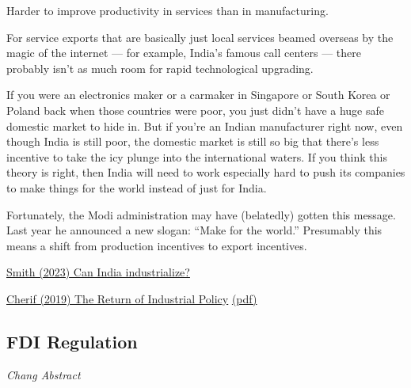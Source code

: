 \documentclass[
]{book}
\begin{document}
Harder to improve productivity in services than in manufacturing.

For service exports that are basically just local services beamed overseas by the magic of the internet --- for example, India's famous call centers --- there probably isn't as much room for rapid technological upgrading.

If you were an electronics maker or a carmaker in Singapore or South Korea or Poland back when those countries were poor, you just didn't have a huge safe domestic market to hide in. But if you're an Indian manufacturer right now, even though India is still poor, the domestic market is still so big that there's less incentive to take the icy plunge into the international waters. If you think this theory is right, then India will need to work especially hard to push its companies to make things for the world instead of just for India.

Fortunately, the Modi administration may have (belatedly) gotten this message. Last year he announced a new slogan: ``Make for the world.'' Presumably this means a shift from production incentives to export incentives.

\href{https://noahpinion.substack.com/p/can-india-industrialize}{Smith (2023) Can India industrialize?}

\citet{cherif_2019}

\href{https://www.imf.org/en/Publications/WP/Issues/2019/03/26/The-Return-of-the-Policy-That-Shall-Not-Be-Named-Principles-of-Industrial-Policy-46710}{Cherif (2019) The Return of Industrial Policy}
\href{pdf/Cherif_2019_Return_of_Industrial_Policy_IMF_WP_19_74.pdf}{(pdf)}

\hypertarget{fdi-regulation}{%
\subsection{FDI Regulation}\label{fdi-regulation}}

\emph{Chang Abstract}
\end{document}
